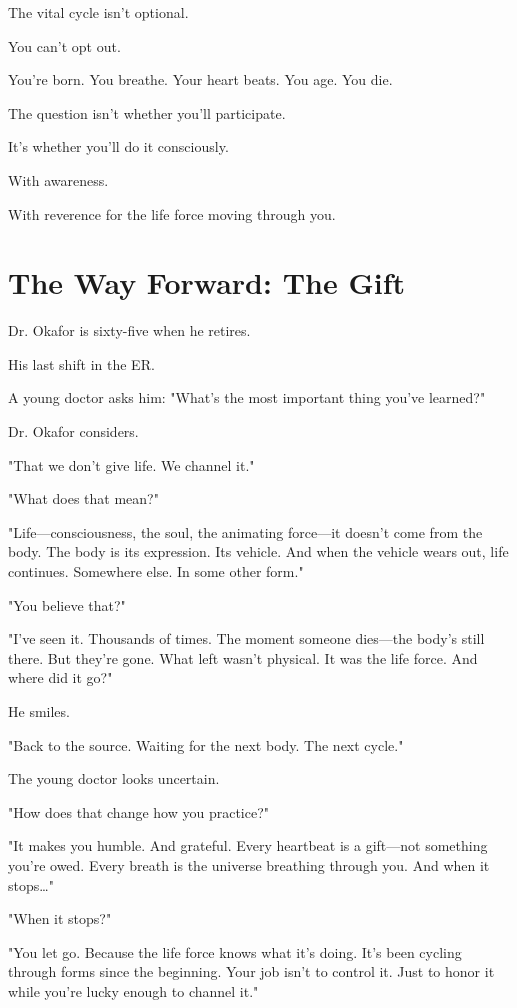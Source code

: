 \documentclass[11pt,twoside]{book}
\begin{document}
The vital cycle isn't optional.

You can't opt out.

You're born. You breathe. Your heart beats. You age. You die.

The question isn't whether you'll participate.

It's whether you'll do it consciously.

With awareness.

With reverence for the life force moving through you.

\section*{The Way Forward: The Gift}

Dr. Okafor is sixty-five when he retires.

His last shift in the ER.

A young doctor asks him: "What's the most important thing you've learned?"

Dr. Okafor considers.

"That we don't give life. We channel it."

"What does that mean?"

"Life—consciousness, the soul, the animating force—it doesn't come from the body. The body is its expression. Its vehicle. And when the vehicle wears out, life continues. Somewhere else. In some other form."

"You believe that?"

"I've seen it. Thousands of times. The moment someone dies—the body's still there. But they're gone. What left wasn't physical. It was the life force. And where did it go?"

He smiles.

"Back to the source. Waiting for the next body. The next cycle."

The young doctor looks uncertain.

"How does that change how you practice?"

"It makes you humble. And grateful. Every heartbeat is a gift—not something you're owed. Every breath is the universe breathing through you. And when it stops\ldots{}"

"When it stops?"

"You let go. Because the life force knows what it's doing. It's been cycling through forms since the beginning. Your job isn't to control it. Just to honor it while you're lucky enough to channel it."
\end{document}
